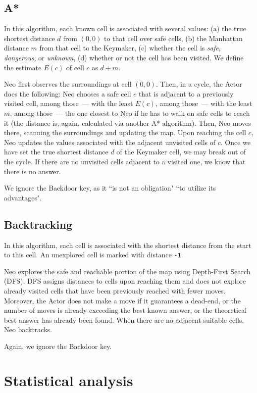 \documentclass[10pt]{article}
\begin{document}
\subsection{A*}
In this algorithm, each known cell is associated with several values: (a) the true shortest distance $d$ from $(0, 0)$ to that cell over safe cells, (b) the Manhattan distance $m$ from that cell to the Keymaker, (c) whether the cell is \textit{safe}, \textit{dangerous}, or \textit{unknown}, (d) whether or not the cell has been visited.
We define the estimate $E(c)$ of cell $c$ as $d + m$.

Neo first observes the surroundings at cell $(0, 0)$. Then, in a cycle, the Actor does the following:\newline
Neo chooses a safe cell $c$ that is adjacent to a previously visited cell, among those~--- with the least $E(c)$, among those~--- with the least $m$, among those~--- the one closest to Neo if he has to walk on safe cells to reach it (the distance is, again, calculated via another A* algorithm). Then, Neo moves there, scanning the surroundings and updating the map. Upon reaching the cell $c$, Neo updates the values associated with the adjacent unvisited cells of $c$. Once we have set the true shortest distance $d$ of the Keymaker cell, we may break out of the cycle. If there are no unvisited cells adjacent to a visited one, we know that there is no answer.

We ignore the Backdoor key, as it ``is not an obligation" ``to utilize its advantages".

\subsection{Backtracking}
In this algorithm, each cell is associated with the shortest distance from the start to this cell. An unexplored cell is marked with distance \texttt{-1}.

Neo explores the safe and reachable portion of the map using Depth-First Search (DFS). DFS assigns distances to cells upon reaching them and does not explore already visited cells that have been previously reached with fewer moves. Moreover, the Actor does not make a move if it guarantees a dead-end, or the number of moves is already exceeding the best known answer, or the theoretical best answer has already been found. When there are no adjacent suitable cells, Neo backtracks.

Again, we ignore the Backdoor key.

\section{Statistical analysis}
\end{document}

